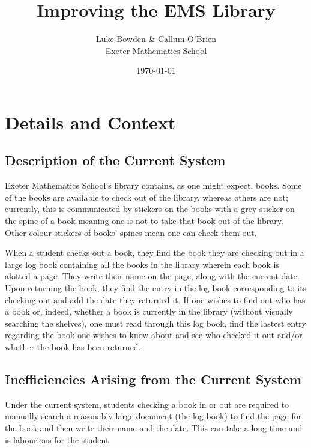 \documentclass[draft]{book}
\begin{document}
\frontmatter

\title{Improving the EMS Library}
\author{Luke Bowden \& Callum O'Brien\\
    Exeter Mathematics School}
\date{\today}
\maketitle

\tableofcontents

\mainmatter

\chapter{Details and Context}

\section{Description of the Current System}

Exeter Mathematics School's library contains, as one might expect, books. Some
of the books are available to check out of the library, whereas others are not;
currently, this is communicated by stickers on the books with a grey sticker on
the spine of a book meaning one is not to take that book out of the library.
Other colour stickers of books' spines mean one can check them out.

When a student checks out a book, they find the book they are checking out in a
large log book containing all the books in the library wherein each book is
alotted a page. They write their name on the page, along with the current date.
Upon returning the book, they find the entry in the log book corresponding to
its checking out and add the date they returned it. If one wishes to find out
who has a book or, indeed, whether a book is currently in the library (without
visually searching the shelves), one must read through this log book, find the
lastest entry regarding the book one wishes to know about and see who checked it
out and/or whether the book has been returned.

\section{Inefficiencies Arising from the Current System}

Under the current system, students checking a book in or out are required to
manually search a reasonably large document (the log book) to find the page for
the book and then write their name and the date. This can take a long time and
is labourious for the student.
\end{document}

